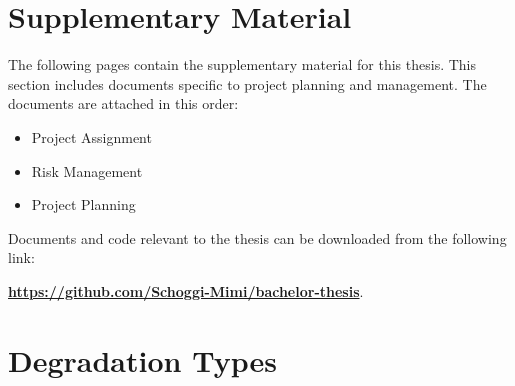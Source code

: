\chapter{Supplementary Material}
\label{ch:Supplementary}

The following pages contain the supplementary material for this thesis. This section includes documents specific to project planning and management. The documents are attached in this order: \par

\begin{itemize}
    \item Project Assignment
    \item Risk Management
    \item Project Planning
\end{itemize}
Documents and code relevant to the thesis can be downloaded from the following link:\par 
\textbf{\url{https://github.com/Schoggi-Mimi/bachelor-thesis}}.


\chapter{Degradation Types}
\label{ch:Degradation_Types}


